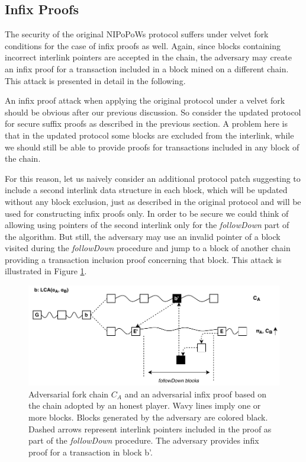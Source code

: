 \subsection{Infix Proofs}
The security of the original NIPoPoWs protocol suffers under velvet fork conditions for the case of
infix proofs as well. Again, since blocks containing incorrect interlink pointers are accepted in the 
chain, the adversary may create an infix proof for a transaction included in a block mined on a
different chain. This attack is presented in detail in the following.

An infix proof attack when applying the original protocol under a velvet fork should be obvious
after our previous discussion. So consider the updated protocol for secure suffix proofs as
described in the previous section. A problem here is that in the updated protocol some blocks
are excluded from the interlink, while we should still be able to provide proofs for transactions
included in any block of the chain.

For this reason, let us naively consider an additional protocol patch suggesting to include
a second interlink data structure in each block, which will be updated without any block exclusion,
just as described in the original protocol and will be used for constructing infix proofs only. In
order to be secure we could think of allowing using pointers of the second interlink only for the
\textit{followDown} part of the algorithm. But still, the adversary may use an invalid pointer of a
block visited during the \textit{followDown} procedure and jump to a block of another chain providing 
a transaction inclusion proof concerning that block. This attack is illustrated in
Figure \ref{fig:infix_attack}.

\begin{figure}[h!]
	\begin{center}
		\includegraphics[width=0.9\columnwidth]{figures/infix_attack.pdf}
	\end{center}
	\caption{Adversarial fork chain $C_A$ and an adversarial infix proof based on the chain
	 adopted by an honest player. Wavy lines imply one or more blocks. Blocks generated by the
	 adversary are colored black. Dashed arrows represent interlink pointers included in the proof
	 as part of the \textit{followDown} procedure. The adversary provides infix proof for a
	 transaction in block b'. }
	\label{fig:infix_attack}
\end{figure}

